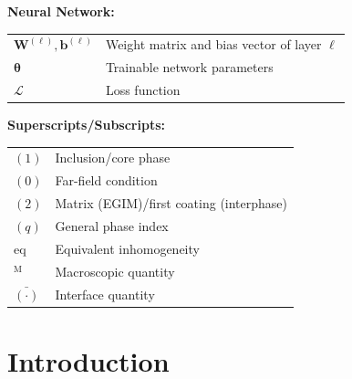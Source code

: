\documentclass[oneside, 12pt, a4paper, bibliography=totoc]{book}
\newcommand{\bs}[1]{\bm{#1}}                       %
\begin{document}
\smallskip
\noindent
\vspace{0.6cm}

\textbf{Neural Network:}
\begin{tabular}{@{}p{2.5cm}p{10cm}@{}}
$\bs{W}^{(\ell)}, \bs{b}^{(\ell)}$ & Weight matrix and bias vector of layer $\ell$ \\[0.3em]
$\bs{\theta}$ & Trainable network parameters \\[0.3em]
$\mathcal{L}$ & Loss function \\[0.3em]
\end{tabular}

\vspace{0.6cm}

\textbf{Superscripts/Subscripts:}
\begin{tabular}{@{}p{2.5cm}p{10cm}@{}}
$(1)$ & Inclusion/core phase \\[0.3em]
$(0)$ & Far-field condition \\[0.3em]
$(2)$ & Matrix (EGIM)/first coating (interphase) \\[0.3em]
$(q)$ & General phase index \\[0.3em]
$\text{eq}$ & Equivalent inhomogeneity \\[0.3em]
${}^{\mathrm{M}}$ & Macroscopic quantity \\[0.3em]
$\bar{(\cdot)}$ & Interface quantity \\[0.3em]
\end{tabular}

\mainmatter
{}















\chapter{Introduction}
\label{ch:introduction}

\end{document}

